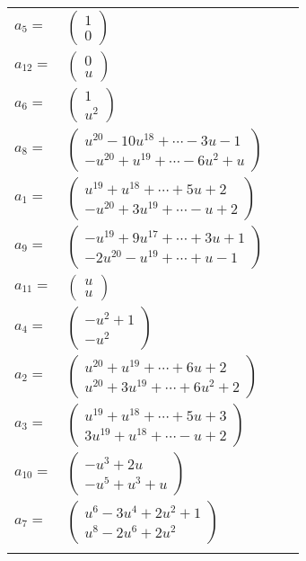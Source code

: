 \documentclass[1p]{elsarticle_modified}
\theoremstyle{definition}
\begin{document}
\begin{tabular}{m{7pt} m{180pt} m{7pt} m{180pt} }
\flushright $a_{5}=$&$\begin{pmatrix}1\\0\end{pmatrix}$ \\
\flushright $a_{12}=$&$\begin{pmatrix}0\\u\end{pmatrix}$ \\
\flushright $a_{6}=$&$\begin{pmatrix}1\\u^2\end{pmatrix}$ \\
\flushright $a_{8}=$&$\begin{pmatrix}u^{20}-10 u^{18}+\cdots-3 u-1\\- u^{20}+u^{19}+\cdots-6 u^2+u\end{pmatrix}$ \\
\flushright $a_{1}=$&$\begin{pmatrix}u^{19}+u^{18}+\cdots+5 u+2\\- u^{20}+3 u^{19}+\cdots- u+2\end{pmatrix}$ \\
\flushright $a_{9}=$&$\begin{pmatrix}- u^{19}+9 u^{17}+\cdots+3 u+1\\-2 u^{20}- u^{19}+\cdots+u-1\end{pmatrix}$ \\
\flushright $a_{11}=$&$\begin{pmatrix}u\\u\end{pmatrix}$ \\
\flushright $a_{4}=$&$\begin{pmatrix}- u^2+1\\- u^2\end{pmatrix}$ \\
\flushright $a_{2}=$&$\begin{pmatrix}u^{20}+u^{19}+\cdots+6 u+2\\u^{20}+3 u^{19}+\cdots+6 u^2+2\end{pmatrix}$ \\
\flushright $a_{3}=$&$\begin{pmatrix}u^{19}+u^{18}+\cdots+5 u+3\\3 u^{19}+u^{18}+\cdots- u+2\end{pmatrix}$ \\
\flushright $a_{10}=$&$\begin{pmatrix}- u^3+2 u\\- u^5+u^3+u\end{pmatrix}$ \\
\flushright $a_{7}=$&$\begin{pmatrix}u^6-3 u^4+2 u^2+1\\u^8-2 u^6+2 u^2\end{pmatrix}$\\&\end{tabular}
\end{document}
